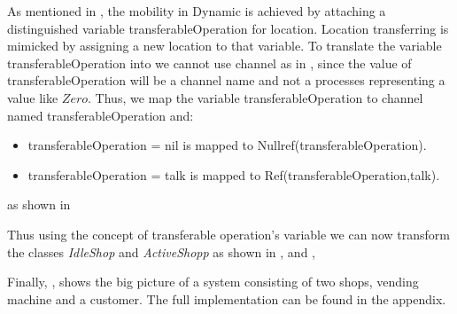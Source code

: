 As mentioned in , the mobility in Dynamic \oz{} is achieved
by attaching a distinguished variable transferableOperation for location. Location transferring
is mimicked by assigning a new location to that variable. To translate the variable transferableOperation into \picalc{} we cannot use \picalc{} channel as in , since the value of transferableOperation will be a channel name and not a processes representing a value like $Zero$. Thus, we map the variable transferableOperation to channel named transferableOperation and:

\begin{itemize}
\item transferableOperation = nil is mapped to Nullref(transferableOperation).

\item transferableOperation = talk is mapped to Ref(transferableOperation,talk).
\end{itemize}
as shown in  

Thus using the concept of transferable operation's variable we can now transform the classes \textit{IdleShop} and \textit{ActiveShopp} as shown in ,  and , 



Finally, ,  shows the big picture of a system consisting of two shops, vending machine and a customer. The full implementation can be found in the appendix.
